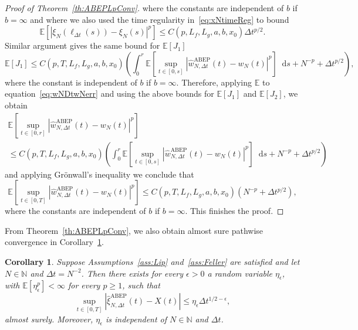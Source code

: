 \documentclass[11pt]{amsart}
\newtheorem{corollary}[theorem]{Corollary}
\newcommand{\E}{{\mathbb E}}
\newcommand*\diff{\mathop{}\!\mathrm{d}}
\newcommand{\ABEP}{\textrm{ABEP}}
\begin{document}
{\begin{proof}[Proof of Theorem~\ref{th:ABEPLpConv}]
where the constants are independent of $b$ if $b=\infty$ and
where we also used the time regularity in~\eqref{eq:xNtimeReg} to bound 
\begin{equation*}
\E \left[ |\xi_{N}(\ell_{\Delta t}(s))-\xi_{N}(s)|^{p} \right] \leq C(p,L_{f},L_{g},a,b,x_{0}) \Delta t^{p/2}.
\end{equation*}
Similar argument gives the same bound for $\E \left[ J_{1} \right]$
\begin{equation*}
\E \left[ J_{1} \right] \leq C(p,T,L_{f},L_{g},a,b,x_{0}) \left( \int_{0}^{r} \E \left[ \sup_{t \in [0,s]} | \hat{w}_{N,\Delta t}^{\ABEP}(t) - w_{N}(t)|^{p} \right] \diff s + N^{-p} + \Delta t^{p/2} \right),
\end{equation*}
where the constant is independent of $b$ if $b=\infty$. Therefore, applying $\E$ to equation~\eqref{eq:wNDtwNerr} and using the above bounds for $\E \left[ J_{1} \right]$ and $\E \left[ J_{2} \right]$, we obtain
\begin{multline*}
\E \left[ \sup_{t \in [0,r]} |\hat{w}_{N,\Delta t}^{\ABEP}(t) - w_{N}(t)|^{p} \right] \\ \leq C(p,T,L_{f},L_{g},a,b,x_{0}) \left( \int_{0}^{r} \E \left[\sup_{t \in [0,s]}| \hat{w}_{N,\Delta t}^{\ABEP}(t) - w_{N}(t)|^{p} \right]  \diff s + N^{-p} + \Delta t^{p/2} \right)
\end{multline*}
and applying Grönwall's inequality we conclude that
\begin{equation*}
\E \left[ \sup_{t \in [0,T]} |\hat{w}_{N,\Delta t}^{\ABEP}(t) - w_{N}(t)|^{p} \right] \leq C(p,T,L_{f},L_{g},a,b,x_{0}) \left( N^{-p} + \Delta t^{p/2} \right),
\end{equation*}
where the constants are independent of $b$ if $b=\infty$. This finishes the proof.
\end{proof}

From Theorem~\ref{th:ABEPLpConv}, we also obtain almost sure pathwise convergence in Corollary~\ref{corr:ABEPasConv}.
\begin{corollary}\label{corr:ABEPasConv}
Suppose Assumptions~\ref{ass:Lip} and~\ref{ass:Feller} are satisfied and let $N \in \mathbb{N}$ and $\Delta t = N^{-2}$. Then there exists for every $\epsilon>0$ a random variable $\eta_{\epsilon}$, with $\E \left[ \eta_{\epsilon}^{p} \right] < \infty$ for every $p \geq 1$, such that
\begin{equation*}
\sup_{t \in [0,T]} |\hat{\xi}^{\ABEP}_{N,\Delta t}(t) - X(t)| \leq \eta_{\epsilon} \Delta t^{1/2 - \epsilon},
\end{equation*}
almost surely. Moreover, $\eta_{\epsilon}$ is independent of $N \in \mathbb{N}$ and $\Delta t$.
\end{corollary}

}
\end{document}
